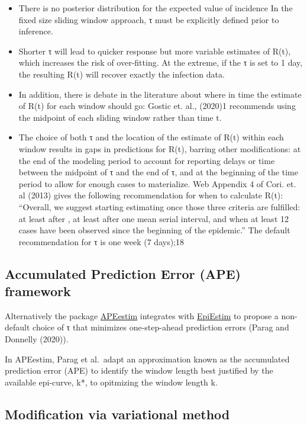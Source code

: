 \documentclass[
  letterpaper,
  DIV=11,
  numbers=noendperiod]{scrreprt}
\begin{document}
\begin{itemize}
\item
  There is no posterior distribution for the expected value of incidence
  In the fixed size sliding window approach, τ must be explicitly
  defined prior to inference.
\item
  Shorter τ will lead to quicker response but more variable estimates of
  R(t), which increases the risk of over-fitting. At the extreme, if the
  τ is set to 1 day, the resulting R(t) will recover exactly the
  infection data.
\item
  In addition, there is debate in the literature about where in time the
  estimate of R(t) for each window should go: Gostic et. al., (2020)1
  recommends using the midpoint of each sliding window rather than time
  t.
\item
  The choice of both τ and the location of the estimate of R(t) within
  each window results in gaps in predictions for R(t), barring other
  modifications: at the end of the modeling period to account for
  reporting delays or time between the midpoint of τ and the end of τ,
  and at the beginning of the time period to allow for enough cases to
  materialize. Web Appendix 4 of Cori. et. al (2013) gives the following
  recommendation for when to calculate R(t): ``Overall, we suggest
  starting estimating once those three criteria are fulfilled: at least
  after , at least after one mean serial interval, and when at least 12
  cases have been observed since the beginning of the epidemic.'' The
  default recommendation for τ is one week (7 days);18
\end{itemize}

\subsection*{Accumulated Prediction Error (APE)
framework}\label{sec-ape}

Alternatively the package \href{package_APEestim.qmd}{APEestim}
integrates with \href{package_EpiEstim.qmd}{EpiEstim} to propose a
non-default choice of τ that minimizes one-step-ahead prediction errors
(Parag and Donnelly (2020)).

In APEestim, Parag et al.~adapt an approximation known as the
accumulated prediction error (APE) to identify the window length best
justified by the available epi-curve, k*, to opitmizing the window
length k.

\subsection*{Modification via variational method}\label{sec-var}
\end{document}

